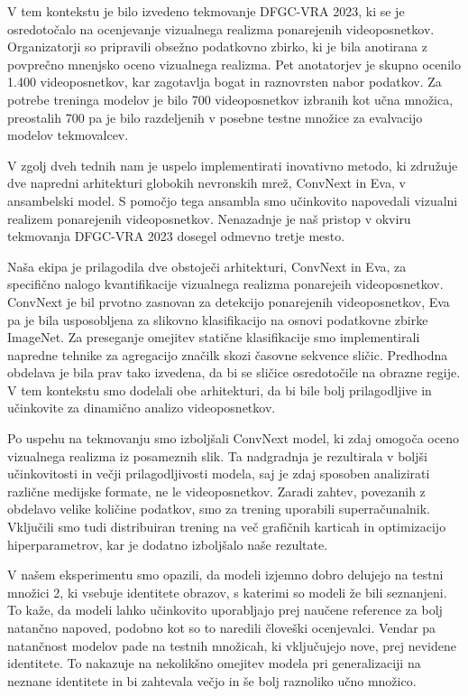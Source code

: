 \documentclass[a4paper,12pt,openright]{book}
\begin{document}
V tem kontekstu je bilo izvedeno tekmovanje DFGC-VRA 2023, ki se je osredotočalo na ocenjevanje vizualnega realizma ponarejenih videoposnetkov. Organizatorji so pripravili obsežno podatkovno zbirko, ki je bila anotirana z povprečno mnenjsko oceno vizualnega realizma. Pet anotatorjev je skupno ocenilo 1.400 videoposnetkov, kar zagotavlja bogat in raznovrsten nabor podatkov. Za potrebe treninga modelov je bilo 700 videoposnetkov izbranih kot učna množica, preostalih 700 pa je bilo razdeljenih v posebne testne množice za evalvacijo modelov tekmovalcev. 

V zgolj dveh tednih nam je uspelo implementirati inovativno metodo, ki združuje dve napredni arhitekturi globokih nevronskih mrež, ConvNext in Eva, v ansambelski model. S pomočjo tega ansambla smo učinkovito napovedali vizualni realizem ponarejenih videoposnetkov. Nenazadnje je naš pristop v okviru tekmovanja DFGC-VRA 2023 dosegel odmevno tretje mesto.

Naša ekipa je prilagodila dve obstoječi arhitekturi, ConvNext in Eva, za specifično nalogo kvantifikacije vizualnega realizma ponarejeih videoposnetkov. ConvNext je bil prvotno zasnovan za detekcijo ponarejenih videoposnetkov, Eva pa je bila usposobljena za slikovno klasifikacijo na osnovi podatkovne zbirke ImageNet.
Za preseganje omejitev statične klasifikacije smo implementirali napredne tehnike za agregacijo značilk skozi časovne sekvence sličic. Predhodna obdelava je bila prav tako izvedena, da bi se sličice osredotočile na obrazne regije. V tem kontekstu smo dodelali obe arhitekturi, da bi bile bolj prilagodljive in učinkovite za dinamično analizo videoposnetkov.

Po uspehu na tekmovanju smo izboljšali ConvNext model, ki zdaj omogoča oceno vizualnega realizma iz posameznih slik. Ta nadgradnja je rezultirala v boljši učinkovitosti in večji prilagodljivosti modela, saj je zdaj sposoben analizirati različne medijske formate, ne le videoposnetkov. 
Zaradi zahtev, povezanih z obdelavo velike količine podatkov, smo za trening uporabili superračunalnik. Vključili smo tudi distribuiran trening na več grafičnih karticah in optimizacijo hiperparametrov, kar je dodatno izboljšalo naše rezultate. 

V našem eksperimentu smo opazili, da modeli izjemno dobro delujejo na testni množici 2, ki vsebuje identitete obrazov, s katerimi so modeli že bili seznanjeni. To kaže, da modeli lahko učinkovito uporabljajo prej naučene reference za bolj natančno napoved, podobno kot so to naredili človeški ocenjevalci.
Vendar pa natančnost modelov pade na testnih množicah, ki vključujejo nove, prej nevidene identitete. To nakazuje na nekolikšno omejitev modela pri generalizaciji na neznane identitete in bi zahtevala večjo in še bolj raznoliko učno množico.
\end{document}
